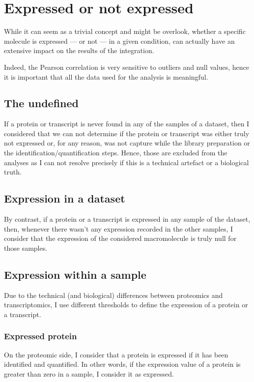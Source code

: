 \section{Expressed or not expressed}
\label{sec:IntegrationExpressedOrNot}

While it can seem as a trivial concept and might be overlook, whether a specific
molecule is expressed --- or not --- in a given condition, can actually have
an extensive impact on the results of the integration.

Indeed, the Pearson correlation is very sensitive to outliers and null values,
hence it is important that all the data used for the analysis is meaningful.

\subsection{The undefined}
\label{sec:IntegrationExpressedOrNot-undefined}
If a protein or transcript is never found in any of the samples of a dataset,
then I considered that we can not determine if the protein or transcript was
either truly not expressed or, for any reason, was not capture while the library
preparation or the identification/quantification steps. Hence, those are
excluded from the analyses as I can not resolve precisely if this is a
technical artefact or a biological truth.

\subsection{Expression in a dataset}
\label{sec:IntegrationExpressedOrNot--expDataset}
By contrast, if a protein or a transcript is expressed in any sample of the
dataset, then, whenever there wasn't any expression recorded in the other
samples, I consider that the expression of the considered macromolecule is truly
null for those samples.

\subsection{Expression within a sample}
Due to the technical (and biological) differences between proteomics and
transcriptomics, I use different thresholds to define the expression of a protein
or a transcript.


\subsubsection{Expressed protein}
On the proteomic side, I consider that a protein is expressed if it has been
identified and quantified. In other words, if the expression value of a protein
is greater than zero in a sample, I consider it as expressed.


